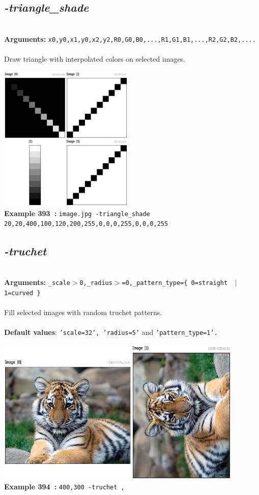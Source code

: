 \documentclass[a4paper,11pt,twoside]{book}
\begin{document}
\subsection{\emph{-triangle\_shade} }\vspace*{-0.5em}
~\\\textbf{Arguments: } 
{\small \texttt{x0,y0,x1,y0,x2,y2,R0,G0,B0,...,R1,G1,B1,...,R2,G2,B2,....}}\\~\\
Draw triangle with interpolated colors on selected images.
\begin{center}\includegraphics[keepaspectratio=true,height=7cm,width=\textwidth]{img/gmic_def393.jpg}\\
{\footnotesize \textbf{Example 393~:} \texttt{image.jpg -triangle\_shade 20,20,400,100,120,200,255,0,0,0,255,0,0,0,255}}
\end{center}

\subsection{\emph{-truchet} }\vspace*{-0.5em}
~\\\textbf{Arguments: } 
{\small \texttt{\_scale$>$0,\_radius$>$=0,\_pattern\_type=\{ 0=straight ~$|$~ 1=curved \}}}\\~\\
Fill selected images with random truchet patterns.
~\\~\\\textbf{Default values}: {\small \texttt{'scale=32', 'radius=5'} and \texttt{'pattern\_type=1'.}}
\begin{center}\includegraphics[keepaspectratio=true,height=7cm,width=\textwidth]{img/gmic_def394.jpg}\\
{\footnotesize \textbf{Example 394~:} \texttt{400,300 -truchet ,}}
\end{center}
\end{document}
